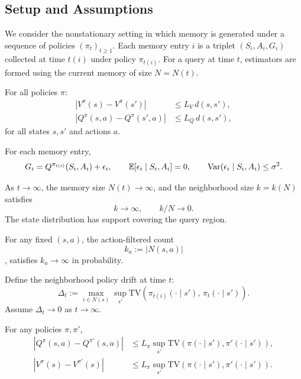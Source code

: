 \subsection{Setup and Assumptions}
We consider the nonstationary setting in which memory is generated under
a sequence of policies $(\pi_t)_{t\ge 1}$. 
Each memory entry $i$ is a triplet $(S_i, A_i, G_i)$ collected at time $t(i)$ under
policy $\pi_{t(i)}$. For a query at time $t$, estimators are formed using the
current memory of size $N=N(t)$.

\begin{assumption}
For all policies $\pi$:
\begin{align*}
|V^\pi(s) - V^\pi(s')| &\le L_V\, d(s,s'), \\
|Q^\pi(s,a) - Q^\pi(s',a)| &\le L_Q\, d(s,s'),
\end{align*}
for all states $s,s'$ and actions $a$.
\end{assumption}

\begin{assumption}
For each memory entry,
\[
G_i = Q^{\pi_{t(i)}}(S_i,A_i) + \epsilon_i,
\qquad
\mathbb{E}[\epsilon_i \mid S_i,A_i]=0,
\qquad
\operatorname{Var}(\epsilon_i \mid S_i,A_i)\le \sigma^2 .
\]
\end{assumption}

\begin{assumption}
As $t\to\infty$, the memory size $N(t)\to\infty$, and the neighborhood size
$k=k(N)$ satisfies
\[
k\to\infty, \qquad k/N \to 0.
\]
The state distribution has support covering the query region.
\end{assumption}

\begin{assumption}
For any fixed $(s,a)$, the action-filtered count
\[
k_a := |N(s,a)|
\],
satisfies $k_a \to \infty$ in probability.
\end{assumption}

\begin{assumption}
Define the neighborhood policy drift at time $t$:
\[
\Delta_t :=
\max_{i\in N(s)}
\sup_{s'}
\mathrm{TV}\!\left(\pi_{t(i)}(\cdot\mid s'),\,
\pi_t(\cdot\mid s')\right).
\]
Assume $\Delta_t \to 0$ as $t\to\infty$.
\end{assumption}

\begin{assumption}
For any policies $\pi,\pi'$,
\begin{align*}
|Q^\pi(s,a) - Q^{\pi'}(s,a)|
&\le L_\pi \sup_{s'} \mathrm{TV}(\pi(\cdot\mid s'),\pi'(\cdot\mid s')),\\
|V^\pi(s) - V^{\pi'}(s)|
&\le L_\pi \sup_{s'} \mathrm{TV}(\pi(\cdot\mid s'),\pi'(\cdot\mid s')) .
\end{align*}
\end{assumption}

